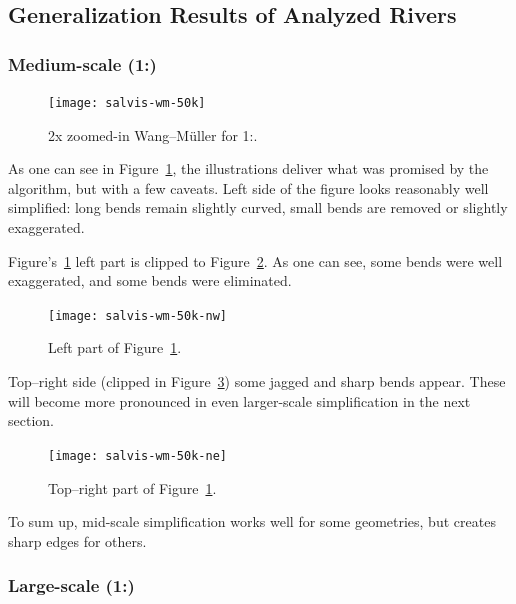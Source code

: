 \documentclass[a4paper]{article}
\newcommand{\WM}{Wang--M{\"u}ller}
\begin{document}
\subsection{Generalization Results of Analyzed Rivers}
\label{sec:generalization-results-of-analyzed-rivers}

\subsubsection{Medium-scale (1:)}
\label{sec:analyzed-medium-scale}

\begin{figure}[h!]
    \centering
    \texttt{[image: salvis-wm-50k]}
    \caption{2x zoomed-in {\WM} for 1:.}
    \label{fig:salvis-wm-50k}
\end{figure}

As one can see in Figure~\ref{fig:salvis-wm-50k}, the illustrations deliver
what was promised by the algorithm, but with a few caveats. Left side of the
figure looks reasonably well simplified: long bends remain slightly curved,
small bends are removed or slightly exaggerated.

Figure's~\ref{fig:salvis-wm-50k} left part is clipped to
Figure~\ref{fig:salvis-wm-50k-nw}. As one can see, some bends were well
exaggerated, and some bends were eliminated.

\begin{figure}[h!]
    \centering
    \texttt{[image: salvis-wm-50k-nw]}
    \caption{Left part of Figure~\ref{fig:salvis-wm-50k}.}
    \label{fig:salvis-wm-50k-nw}
\end{figure}

Top--right side (clipped in Figure~\ref{fig:salvis-wm-50k-ne}) some jagged
and sharp bends appear. These will become more pronounced in even larger-scale
simplification in the next section.

\begin{figure}[h!]
    \centering
    \texttt{[image: salvis-wm-50k-ne]}
    \caption{Top--right part of Figure~\ref{fig:salvis-wm-50k}.}
    \label{fig:salvis-wm-50k-ne}
\end{figure}

To sum up, mid-scale simplification works well for some geometries, but creates
sharp edges for others.

\subsubsection{Large-scale (1:)}
\label{sec:analyzed-large-scale}
\end{document}
